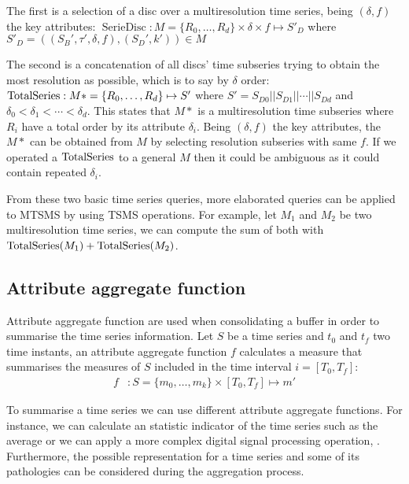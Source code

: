 The first is a selection of a disc over a multiresolution time series,
being $(\delta,f)$ the key attributes: $\operatorname{SerieDisc}:
M=\{R_0, \dots, R_d\} \times \delta \times f \mapsto S'_D$ where $S'_D
= ( (S_B',\tau',\delta,f) , (S_D',k') ) \in M$

The second is a concatenation of all discs' time subseries trying to
obtain the most resolution as possible, which is to say by $\delta$
order: $\operatorname{TotalSeries}: M*=\{R_0, \dots, R_d\} \mapsto S'$ where $S' =
S_{D0} || S_{D1} || \cdots || S_{Dd}$ and $\delta_0 < \delta_1 <
\cdots < \delta_d$. This states that $M*$ is a multiresolution time
subseries where $R_i$ have a total order by its attribute
$\delta_i$. Being $(\delta,f)$ the key attributes, the $M*$ can
be obtained from $M$ by selecting resolution subseries with same $f$. If we
operated a $\operatorname{TotalSeries}$ to a general $M$ then it could be ambiguous
as it could contain repeated $\delta_i$.




From these two basic time series queries, more elaborated queries can
be applied to MTSMS by using TSMS operations. For example, let $M_1$
and $M_2$ be two multiresolution time series, we can compute the sum
of both with $\operatorname{TotalSeries}(M_1) + \operatorname{TotalSeries}(M_2)$. 





\subsection{Attribute aggregate function}
\label{sec:model:interpolador}

Attribute aggregate function are used when consolidating a buffer in
order to summarise the time series information. Let $S$ be a time
series and $t_0$ and $t_f$ two time instants, an attribute aggregate
function $f$ calculates a measure that summarises the measures of $S$
included in the time interval $i=[T_0,T_f]$:
\begin{align*}
f&:S=\{m_0,\ldots,m_k\} \times [T_0,T_f] \mapsto m'
\end{align*}

To summarise a time series we can use different attribute aggregate
functions.  For instance, we can calculate an statistic indicator of
the time series such as the average or we can apply a more complex
digital signal processing operation, \cite{zhang11}. Furthermore, the
possible representation for a time series and some of its pathologies
can be considered during the aggregation process.



